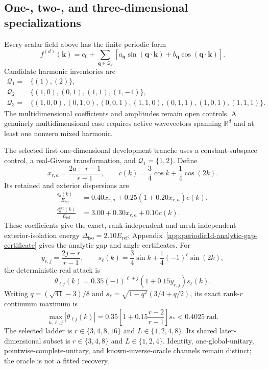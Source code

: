 \documentclass[11pt]{article}
\newenvironment{prospective}{\color{prospectivered}}{}
\begin{document}
\begin{prospective}
\subsection{One-, two-, and three-dimensional specializations}
Every scalar field above has the finite periodic form
\begin{equation}
 f^{(d)}(\mathbf k)=c_0+
 \sum_{\mathbf q\in\mathcal Q_d}
 \left[a_{\mathbf q}\sin(\mathbf q\cdot\mathbf k)
 +b_{\mathbf q}\cos(\mathbf q\cdot\mathbf k)\right].
\end{equation}
Candidate harmonic inventories are
\begin{align}
 \mathcal Q_1={}&\{(1),(2)\},\\
 \mathcal Q_2={}&\{(1,0),(0,1),(1,1),(1,-1)\},\\
 \mathcal Q_3={}&\{(1,0,0),(0,1,0),(0,0,1),
 (1,1,0),(0,1,1),(1,0,1),(1,1,1)\}.
\end{align}
The multidimensional coefficients and amplitudes remain open controls. A genuinely
multidimensional case requires active wavevectors spanning $\mathbb R^d$ and at least
one nonzero mixed harmonic.

The selected first one-dimensional development tranche uses a constant-subspace control, a real-Givens transformation, and
$\mathcal Q_1=\{1,2\}$. Define
\begin{equation}
 x_{r,a}=\frac{2a-r-1}{r-1},
 \qquad
 c(k)=\frac34\cos k+\frac14\cos(2k).
\end{equation}
Its retained and exterior dispersions are
\begin{align}
 \frac{\epsilon_a(k)}{E_{\mathrm{ref}}}
 &=0.40x_{r,a}+0.25(1+0.20x_{r,a})c(k),\\
 \frac{\epsilon_a^{\mathrm{ext}}(k)}{E_{\mathrm{ref}}}
 &=3.00+0.30x_{r,a}+0.10c(k).
\end{align}
These coefficients give the exact, rank-independent and mesh-independent
exterior-isolation energy $\Delta_{\mathrm{iso}}=2.10E_{\mathrm{ref}}$;
Appendix~\ref{app:periodic1d-analytic-gap-certificate} gives the
analytic gap and angle certificates. For
\begin{equation}
 y_{r,j}=\frac{2j-r}{r-1},
 \qquad
 s_\ell(k)=\frac34\sin k+\frac14(-1)^\ell\sin(2k),
\end{equation}
the deterministic real attack is
\begin{equation}
 \theta_{\ell j}(k)=0.35(-1)^{\ell+j}
 (1+0.15y_{r,j})s_\ell(k).
\end{equation}
Writing $q=(\sqrt{41}-3)/8$ and
$s_*=\sqrt{1-q^2}(3/4+q/2)$, its exact rank-$r$ continuum maximum is
\begin{equation}
 \max_{k,\ell,j}|\theta_{\ell j}(k)|
 =0.35\left[1+0.15\frac{r-2}{r-1}\right]s_*<0.4025\ \mathrm{rad}.
\end{equation}
The selected ladder is
$r\in\{3,4,8,16\}$ and $L\in\{1,2,4,8\}$. Its shared later-dimensional subset is
$r\in\{3,4,8\}$ and $L\in\{1,2,4\}$. Identity, one-global-unitary,
pointwise-complete-unitary, and known-inverse-oracle channels remain distinct; the oracle
is not a fitted recovery.


\end{prospective}
\end{document}
